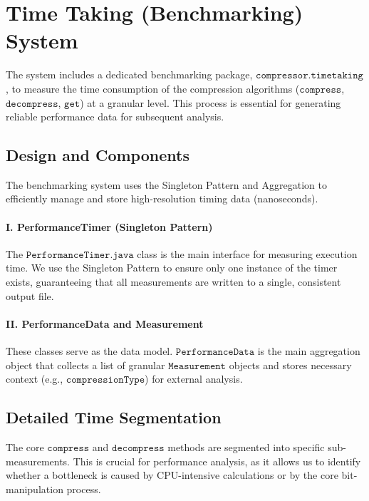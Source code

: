 \documentclass[11pt, a4paper]{article}
\begin{document}
	
	\section{Time Taking (Benchmarking) System}
	\label{sec:timetaking_system}
	
	The system includes a dedicated benchmarking package, $\texttt{compressor.timetaking}$, to measure the time consumption of the compression algorithms ($\texttt{compress}$, $\texttt{decompress}$, $\texttt{get}$) at a granular level. This process is essential for generating reliable performance data for subsequent analysis.
	
	\subsection{Design and Components}
	\label{sec:timetaking_design}
	
	The benchmarking system uses the Singleton Pattern and Aggregation to efficiently manage and store high-resolution timing data (nanoseconds).
	
	\paragraph{I. PerformanceTimer (Singleton Pattern)}
	The $\texttt{PerformanceTimer.java}$ class is the main interface for measuring execution time. We use the Singleton Pattern to ensure only one instance of the timer exists, guaranteeing that all measurements are written to a single, consistent output file.
	
	\paragraph{II. PerformanceData and Measurement}
	These classes serve as the data model. $\texttt{PerformanceData}$ is the main aggregation object that collects a list of granular $\texttt{Measurement}$ objects and stores necessary context (e.g., $\texttt{compressionType}$) for external analysis.
	
	\subsection{Detailed Time Segmentation}
	\label{sec:time_segmentation}
	
	The core $\texttt{compress}$ and $\texttt{decompress}$ methods are segmented into specific sub-measurements. This is crucial for performance analysis, as it allows us to identify whether a bottleneck is caused by CPU-intensive calculations or by the core bit-manipulation process.
	
\end{document}
